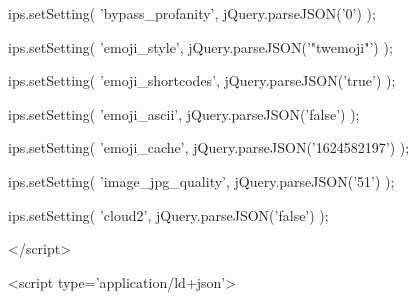 			ips.setSetting( 'bypass_profanity', jQuery.parseJSON('0') );
		
			ips.setSetting( 'emoji_style', jQuery.parseJSON('"twemoji"') );
		
			ips.setSetting( 'emoji_shortcodes', jQuery.parseJSON('true') );
		
			ips.setSetting( 'emoji_ascii', jQuery.parseJSON('false') );
		
			ips.setSetting( 'emoji_cache', jQuery.parseJSON('1624582197') );
		
			ips.setSetting( 'image_jpg_quality', jQuery.parseJSON('51') );
		
			ips.setSetting( 'cloud2', jQuery.parseJSON('false') );
		
		
	</script>



<script type='application/ld+json'>
